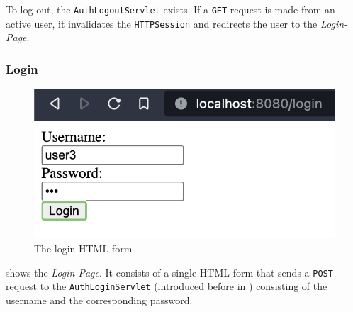 To log out, the \texttt{AuthLogoutServlet} exists. If a \texttt{GET} request is made from an active user, it invalidates the \texttt{HTTPSession} and redirects the user to the \textit{Login-Page}.


\subsubsection{Login}\label{subsubsec:03_impl_servlets_login}
\begin{figure}[h]
\centering
\includegraphics[scale=0.5]{images/03_impl/login/login_form}
\caption{The login HTML form}
\label{fig:03_impl_servlets_login_form}
\end{figure}
 shows the \textit{Login-Page}. It consists of a single HTML form that sends a \texttt{POST} request to the \texttt{AuthLoginServlet} (introduced before in ) consisting of the username and the corresponding password.


